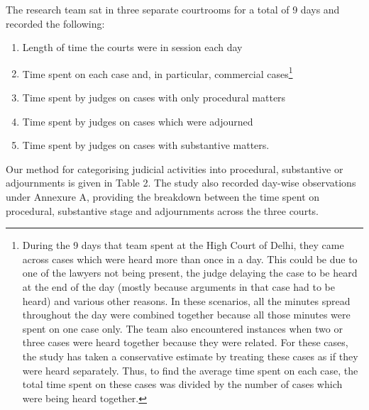 \documentclass[a4paper, 12pt, twoside]{article}
\begin{document}
The research team sat in three separate courtrooms for a total of 9 days and recorded the following:
\begin{enumerate}
\item Length of time the courts were in session each day
\item Time spent on each case and, in particular, commercial cases\footnote{During the 9 days that team spent at the High Court of Delhi, they came across cases which were heard more than once in a day. This could be due to one of the lawyers not being present, the judge delaying the case to be heard at the end of the day (mostly because arguments in that case had to be heard) and various other reasons. In these scenarios, all the minutes spread throughout the day were combined together because all those minutes were spent on one case only. The team also encountered instances when two or three cases were heard together because they were related. For these cases, the study has taken a conservative estimate by treating these cases as if they were heard separately. Thus, to find the average time spent on each case, the total time spent on these cases was divided by the number of cases which were being heard together.}
\item Time spent by judges on cases with only procedural matters
\item Time spent by judges on cases which were adjourned 
\item Time spent by judges on cases with substantive matters.
\end{enumerate}

Our method for categorising judicial activities into procedural, substantive or adjournments is given in Table 2. The study also recorded day-wise observations under Annexure A, providing the breakdown between the time spent on procedural, substantive stage and adjournments across the three courts. 
\end{document}
